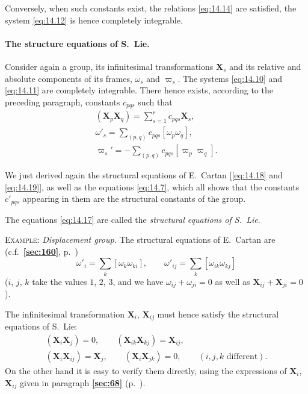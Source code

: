 \documentclass[leqno,11pt]{book}
\numberwithin{equation}{chapter}
\theoremstyle{shape1}
\theoremstyle{shapesmall}
\newcommand{\fsref}[1]{{\rm\textsection\textbf{\ref{sec:#1}}}}
\newcommand{\vp}{\varpi}
\begin{document}
Conversely, when such constants exist, the relations \eqref{eq:14.14} are satisfied, the system \eqref{eq:14.12} is hence completely integrable.

\paragraph{The structure equations of S.~Lie.}
\label{sec:210}
Consider again a group, its infinitesimal transformations $\mathbf{X}_{s}$ and its relative and absolute components of its frames, $\omega_{s}$ and $\vp_{s}$. The systems \eqref{eq:14.10} and \eqref{eq:14.11} are completely integrable. There hence exists, according to the preceding paragraph, constants $c_{pqs}$ such that
\begin{gather}
  \label{eq:14.17}
  (\mathbf{X}_{p}\mathbf{X}_{q})=\sum_{s=1}^{r}c_{pqs}\mathbf{X}_{s},\\
  \label{eq:14.18}
  \omega'_{s}=\sum_{(p,q)}c_{pqs}[\omega_{p}\omega_{q}],\\
  \label{eq:14.19}
  \vp_{s}'=-\sum_{(p,q)}c_{pqs}[\vp_{p}\vp_{q}].
\end{gather}

We just derived again the structural equations of E.~Cartan [\eqref{eq:14.18} and \eqref{eq:14.19}], as well as the equations \eqref{eq:14.7}, which all shows that the constants $c'_{pqs}$ appearing in them are the structural constants of the group.

The equations \eqref{eq:14.17} are called the \emph{structural equations of S.~Lie}.

{\small
\textsc{Example:} \emph{Displacement group.} The structural equations of E.~Cartan are (c.f.~\fsref{160}, p.~\pageref{sec:160})
\[
\omega'_{i}=\sum_{k}[\omega_{k}\omega_{ki}],\qquad\omega'_{ij}=\sum_{k}[\omega_{ik}\omega_{kj}]
\]
($i$, $j$, $k$ take the values $1$, $2$, $3$, and we have $\omega_{ij}+\omega_{ji}=0$ as well as $\mathbf{X}_{ij}+\mathbf{X}_{ji}=0$).

The infinitesimal transformation $\mathbf{X}_{i}$, $\mathbf{X}_{ij}$ must hence satisfy the structural equations of S.~Lie:
\begin{gather*}
  (\mathbf{X}_{i}\mathbf{X}_{j})=0,\qquad
  (\mathbf{X}_{ik}\mathbf{X}_{kj})=\mathbf{X}_{ij},\\
  (\mathbf{X}_{i}\mathbf{X}_{ij})=\mathbf{X}_{j},\qquad
  (\mathbf{X}_{i}\mathbf{X}_{jk})=0,\qquad(i,j,k\text{ different}).
\end{gather*}
On the other hand it is easy to verify them directly, using the expressions of $\mathbf{X}_{i}$, $\mathbf{X}_{ij}$ given in paragraph \fsref{68} (p.~\pageref{sec:68}).
}
\end{document}
